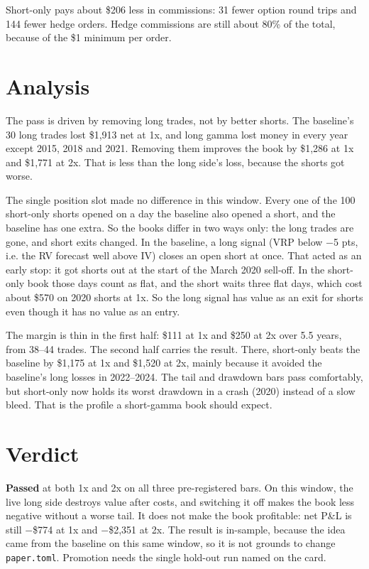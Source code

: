 \documentclass{article}
\begin{document}
Short-only pays about \$206 less in commissions: 31 fewer option round trips and 144 fewer hedge orders. Hedge commissions are still about 80\% of the total, because of the \$1 minimum per order.

\section{Analysis}

The pass is driven by removing long trades, not by better shorts. The baseline's 30 long trades lost \$1,913 net at 1x, and long gamma lost money in every year except 2015, 2018 and 2021. Removing them improves the book by \$1,286 at 1x and \$1,771 at 2x. That is less than the long side's loss, because the shorts got worse.

The single position slot made no difference in this window. Every one of the 100 short-only shorts opened on a day the baseline also opened a short, and the baseline has one extra. So the books differ in two ways only: the long trades are gone, and short exits changed. In the baseline, a long signal (VRP below \ensuremath{-}5 pts, i.e. the RV forecast well above IV) closes an open short at once. That acted as an early stop: it got shorts out at the start of the March 2020 sell-off. In the short-only book those days count as flat, and the short waits three flat days, which cost about \$570 on 2020 shorts at 1x. So the long signal has value as an exit for shorts even though it has no value as an entry.

The margin is thin in the first half: \$111 at 1x and \$250 at 2x over 5.5 years, from 38--44 trades. The second half carries the result. There, short-only beats the baseline by \$1,175 at 1x and \$1,520 at 2x, mainly because it avoided the baseline's long losses in 2022--2024. The tail and drawdown bars pass comfortably, but short-only now holds its worst drawdown in a crash (2020) instead of a slow bleed. That is the profile a short-gamma book should expect.

\section{Verdict}

\textbf{Passed} at both 1x and 2x on all three pre-registered bars. On this window, the live long side destroys value after costs, and switching it off makes the book less negative without a worse tail. It does not make the book profitable: net P\&L is still \ensuremath{-}\$774 at 1x and \ensuremath{-}\$2,351 at 2x. The result is in-sample, because the idea came from the baseline on this same window, so it is not grounds to change \texttt{paper.\allowbreak{}toml}. Promotion needs the single hold-out run named on the card.
\end{document}
